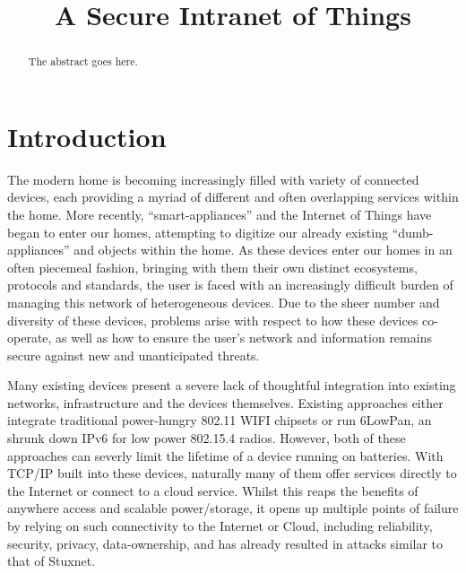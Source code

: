 \documentclass[conference]{./sty/IEEEtran}
\begin{document}
%
\title{A Secure Intranet of Things}


\author{
}

\maketitle


\begin{abstract}
The abstract goes here.
\end{abstract}


\section{Introduction}
The modern home is becoming increasingly filled with variety of connected devices, each providing a myriad of different and often overlapping services within the home. More recently, ``smart-appliances'' and the Internet of Things have began to enter our homes, attempting to digitize our already existing ``dumb-appliances'' and objects within the home. As these devices enter our homes in an often piecemeal fashion, bringing with them their own distinct ecosystems, protocols and standards, the user is faced with an increasingly difficult burden of managing this network of heterogeneous devices. Due to the sheer number and diversity of these devices, problems arise with respect to how these devices co-operate, as well as how to ensure the user's network and information remains secure against new and unanticipated threats.

Many existing devices present a severe lack of thoughtful integration into existing networks, infrastructure and the devices themselves. Existing approaches either integrate traditional power-hungry 802.11 WIFI chipsets or run 6LowPan, an shrunk down IPv6 for low power 802.15.4 radios. However, both of these approaches can severly limit the lifetime of a device running on batteries. With TCP/IP built into these devices, naturally many of them offer services directly to the Internet\cite{MQTT,IETF_CORE,Xively} or connect to a cloud service\cite{SmartThings,Twine}. Whilst this reaps the benefits of anywhere access and scalable power/storage, it opens up multiple points of failure by relying on such connectivity to the Internet or Cloud, including reliability, security, privacy, data-ownership, and has already resulted in attacks similar to that of Stuxnet\cite{IoTWorm}.
\end{document}
